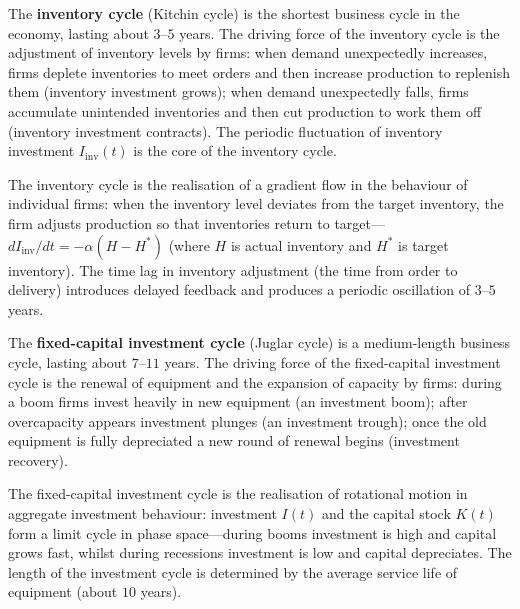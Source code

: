 \begin{definition}\label{def:kitchin_cycle}
The \textbf{inventory cycle} (Kitchin cycle) is the shortest business cycle in the economy, lasting about $3$--$5$ years. The driving force of the inventory cycle is the adjustment of inventory levels by firms: when demand unexpectedly increases, firms deplete inventories to meet orders and then increase production to replenish them (inventory investment grows); when demand unexpectedly falls, firms accumulate unintended inventories and then cut production to work them off (inventory investment contracts). The periodic fluctuation of inventory investment $I_{\text{inv}}(t)$ is the core of the inventory cycle.

The inventory cycle is the realisation of a gradient flow in the behaviour of individual firms: when the inventory level deviates from the target inventory, the firm adjusts production so that inventories return to target---$dI_{\text{inv}}/dt = -\alpha(H - H^*)$ (where $H$ is actual inventory and $H^*$ is target inventory). The time lag in inventory adjustment (the time from order to delivery) introduces delayed feedback and produces a periodic oscillation of $3$--$5$ years.
\end{definition}

\begin{definition}\label{def:juglar_cycle}
The \textbf{fixed-capital investment cycle} (Juglar cycle) is a medium-length business cycle, lasting about $7$--$11$ years. The driving force of the fixed-capital investment cycle is the renewal of equipment and the expansion of capacity by firms: during a boom firms invest heavily in new equipment (an investment boom); after overcapacity appears investment plunges (an investment trough); once the old equipment is fully depreciated a new round of renewal begins (investment recovery).

The fixed-capital investment cycle is the realisation of rotational motion in aggregate investment behaviour: investment $I(t)$ and the capital stock $K(t)$ form a limit cycle in phase space---during booms investment is high and capital grows fast, whilst during recessions investment is low and capital depreciates. The length of the investment cycle is determined by the average service life of equipment (about $10$ years).
\end{definition}

